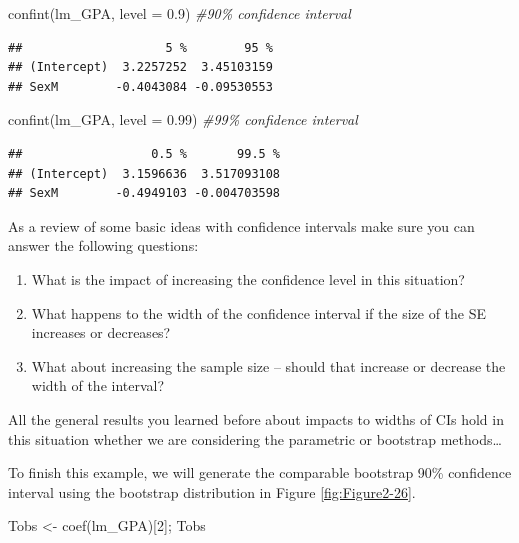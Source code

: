 \documentclass[
]{book}
\newenvironment{Shaded}{\begin{snugshade}}{\end{snugshade}}
\newcommand{\AttributeTok}[1]{\textcolor[rgb]{0.77,0.63,0.00}{#1}}
\newcommand{\CommentTok}[1]{\textcolor[rgb]{0.56,0.35,0.01}{\textit{#1}}}
\newcommand{\DecValTok}[1]{\textcolor[rgb]{0.00,0.00,0.81}{#1}}
\newcommand{\FloatTok}[1]{\textcolor[rgb]{0.00,0.00,0.81}{#1}}
\newcommand{\FunctionTok}[1]{\textcolor[rgb]{0.00,0.00,0.00}{#1}}
\newcommand{\NormalTok}[1]{#1}
\newcommand{\OtherTok}[1]{\textcolor[rgb]{0.56,0.35,0.01}{#1}}
\begin{document}
\begin{Shaded}
\begin{Highlighting}[]
\FunctionTok{confint}\NormalTok{(lm\_GPA, }\AttributeTok{level =} \FloatTok{0.9}\NormalTok{) }\CommentTok{\#90\% confidence interval}
\end{Highlighting}
\end{Shaded}

\begin{verbatim}
##                    5 %        95 %
## (Intercept)  3.2257252  3.45103159
## SexM        -0.4043084 -0.09530553
\end{verbatim}

\begin{Shaded}
\begin{Highlighting}[]
\FunctionTok{confint}\NormalTok{(lm\_GPA, }\AttributeTok{level =} \FloatTok{0.99}\NormalTok{) }\CommentTok{\#99\% confidence interval}
\end{Highlighting}
\end{Shaded}

\begin{verbatim}
##                  0.5 %       99.5 %
## (Intercept)  3.1596636  3.517093108
## SexM        -0.4949103 -0.004703598
\end{verbatim}

\indent As a review of some basic ideas with confidence intervals make sure
you can answer the following questions:

\begin{enumerate}
\def\labelenumi{\arabic{enumi}.}
\item
  What is the impact of increasing the confidence level in this situation?
\item
  What happens to the width of the confidence interval if the size of the
  SE increases or decreases?
\item
  What about increasing the sample size -- should that increase or decrease
  the width of the interval?
\end{enumerate}

All the general results you learned before about impacts to widths of CIs hold
in this situation whether we are considering the parametric or bootstrap methods\ldots{}

\indent To finish this example, we will generate the comparable bootstrap 90\%
confidence interval using the bootstrap distribution in
Figure \ref{fig:Figure2-26}.

\begin{Shaded}
\begin{Highlighting}[]
\NormalTok{Tobs }\OtherTok{\textless{}{-}} \FunctionTok{coef}\NormalTok{(lm\_GPA)[}\DecValTok{2}\NormalTok{]; Tobs}
\end{Highlighting}
\end{Shaded}
\end{document}
